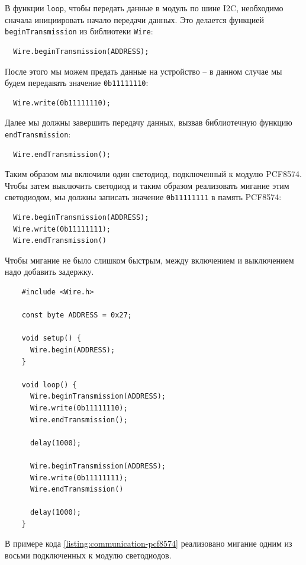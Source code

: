 \documentclass[../sparc.tex]{subfiles}
\begin{document}
В функции \texttt{loop}, чтобы передать данные в модуль по шине I2C, необходимо
сначала инициировать начало передачи данных.  Это делается функцией
\texttt{beginTransmission} из библиотеки \texttt{Wire}:

\begin{verbatim}
  Wire.beginTransmission(ADDRESS);
\end{verbatim}

После этого мы можем предать данные на устройство -- в данном случае мы будем
передавать значение \texttt{0b11111110}:

\begin{verbatim}
  Wire.write(0b11111110);
\end{verbatim}

Далее мы должны завершить передачу данных, вызвав библиотечную функцию
\texttt{endTransmission}:

\begin{verbatim}
  Wire.endTransmission();
\end{verbatim}

Таким образом мы включили один светодиод, подключенный к модулю PCF8574.  Чтобы
затем выключить светодиод и таким образом реализовать мигание этим светодиодом,
мы должны записать значение \texttt{0b11111111} в память PCF8574:

\begin{verbatim}
  Wire.beginTransmission(ADDRESS);
  Wire.write(0b11111111);
  Wire.endTransmission()
\end{verbatim}

Чтобы мигание не было слишком быстрым, между включением и выключением надо
добавить задержку.

\begin{listing}[H]
  \begin{verbatim}
    #include <Wire.h>

    const byte ADDRESS = 0x27;

    void setup() {
      Wire.begin(ADDRESS);
    }

    void loop() {
      Wire.beginTransmission(ADDRESS);
      Wire.write(0b11111110);
      Wire.endTransmission();

      delay(1000);

      Wire.beginTransmission(ADDRESS);
      Wire.write(0b11111111);
      Wire.endTransmission()

      delay(1000);
    }
  \end{verbatim}
  \label{listing:communication-pcf8574}
  \caption{Пример управления светодиодами через модуль PCF8574 и библиотеку
    Wire.}
\end{listing}

В примере кода \ref{listing:communication-pcf8574} реализовано мигание одним из
восьми подключенных к модулю светодиодов.
\end{document}
